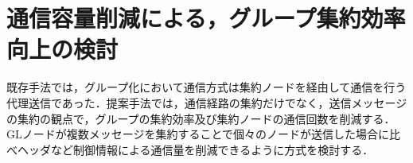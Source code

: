 \section{通信容量削減による，グループ集約効率向上の検討}
既存手法では，グループ化において通信方式は集約ノードを経由して通信を行う代理送信であった．提案手法では，通信経路の集約だけでなく，送信メッセージの集約の観点で，グループの集約効率及び集約ノードの通信回数を削減する．GLノードが複数メッセージを集約することで個々のノードが送信した場合に比べヘッダなど制御情報による通信量を削減できるように方式を検討する．